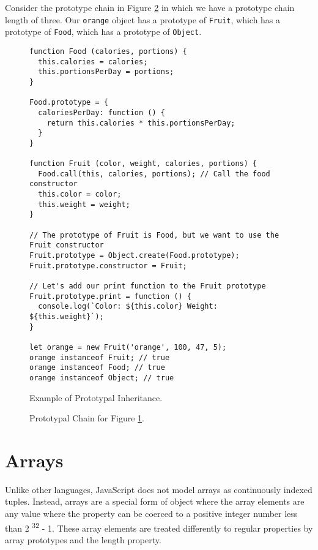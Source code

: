 \documentclass[]{final_report}
\begin{document}
Consider the prototype chain in Figure \ref{fig:js-prototypal-chain} in which we have a prototype chain length of three. Our \lstinline{orange} object has a prototype of \lstinline{Fruit}, which has a prototype of \lstinline{Food}, which has a prototype of \lstinline{Object}.


\begin{figure}[t]
\begin{lstlisting}
function Food (calories, portions) {
  this.calories = calories;
  this.portionsPerDay = portions;
}

Food.prototype = {
  caloriesPerDay: function () {
    return this.calories * this.portionsPerDay;
  }
}

function Fruit (color, weight, calories, portions) {
  Food.call(this, calories, portions); // Call the food constructor
  this.color = color;
  this.weight = weight;
}

// The prototype of Fruit is Food, but we want to use the Fruit constructor
Fruit.prototype = Object.create(Food.prototype);
Fruit.prototype.constructor = Fruit;

// Let's add our print function to the Fruit prototype
Fruit.prototype.print = function () {
  console.log(`Color: ${this.color} Weight: ${this.weight}`);
}

let orange = new Fruit('orange', 100, 47, 5);
orange instanceof Fruit; // true
orange instanceof Food; // true
orange instanceof Object; // true
\end{lstlisting}
\caption{\label{fig:js-prototypal-inheritance} Example of Prototypal Inheritance.}
\end{figure} 

\begin{figure}[t]
\centering
\fboxsep 2mm
\caption{\label{fig:js-prototypal-chain} Prototypal Chain for Figure \ref{fig:js-prototypal-inheritance}.}
\end{figure} 

\section{Arrays} \label{sec:arrays}
Unlike other languages, JavaScript does not model arrays as continuously indexed tuples. Instead, arrays are a special form of object where the array elements are any value where the property can be coerced to a positive integer number less than 2 \textsuperscript{32} - 1. These array elements are treated differently to regular properties by array prototypes and the length property. 
\end{document}
